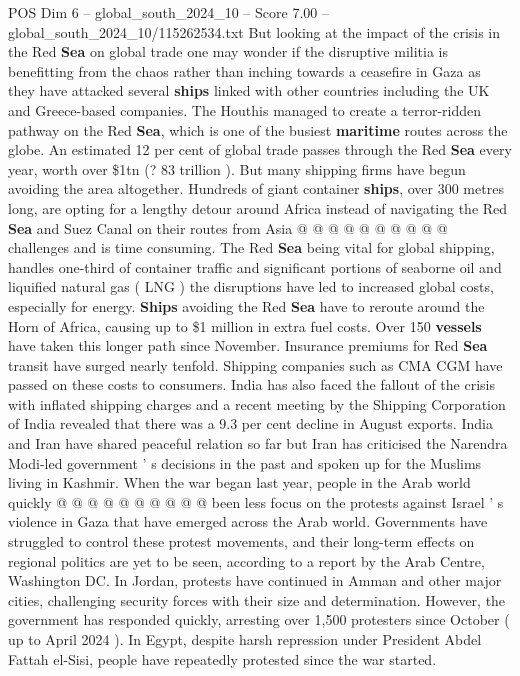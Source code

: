 \begin{textsample}{POS Dim 6 – global\_south\_2024\_10 – Score 7.00 – global\_south\_2024\_10/115262534.txt}
But looking at the impact of the crisis in the Red \textbf{Sea} on global trade one may wonder if the disruptive militia is benefitting from the chaos rather than inching towards a ceasefire in Gaza as they have attacked several \textbf{ships} linked with other countries including the UK and Greece-based companies.
The Houthis managed to create a terror-ridden pathway on the Red \textbf{Sea}, which is one of the busiest \textbf{maritime} routes across the globe.
An estimated 12 per cent of global trade passes through the Red \textbf{Sea} every year, worth over \$1tn (? 83 trillion ).
But many shipping firms have begun avoiding the area altogether.
Hundreds of giant container \textbf{ships}, over 300 metres long, are opting for a lengthy detour around Africa instead of navigating the Red \textbf{Sea} and Suez Canal on their routes from Asia @ @ @ @ @ @ @ @ @ @ challenges and is time consuming.
The Red \textbf{Sea} being vital for global shipping, handles one-third of container traffic and significant portions of seaborne oil and liquified natural gas ( LNG ) the disruptions have led to increased global costs, especially for energy. \textbf{Ships} avoiding the Red \textbf{Sea} have to reroute around the Horn of Africa, causing up to \$1 million in extra fuel costs.
Over 150 \textbf{vessels} have taken this longer path since November.
Insurance premiums for Red \textbf{Sea} transit have surged nearly tenfold.
Shipping companies such as CMA CGM have passed on these costs to consumers.
India has also faced the fallout of the crisis with inflated shipping charges and a recent meeting by the Shipping Corporation of India revealed that there was a 9.3 per cent decline in August exports.
India and Iran have shared peaceful relation so far but Iran has criticised the Narendra Modi-led government ' s decisions in the past and spoken up for the Muslims living in Kashmir.
When the war began last year, people in the Arab world quickly @ @ @ @ @ @ @ @ @ @ been less focus on the protests against Israel ' s violence in Gaza that have emerged across the Arab world.
Governments have struggled to control these protest movements, and their long-term effects on regional politics are yet to be seen, according to a report by the Arab Centre, Washington DC.
In Jordan, protests have continued in Amman and other major cities, challenging security forces with their size and determination.
However, the government has responded quickly, arresting over 1,500 protesters since October ( up to April 2024 ).
In Egypt, despite harsh repression under President Abdel Fattah el-Sisi, people have repeatedly protested since the war started.

\end{textsample}

